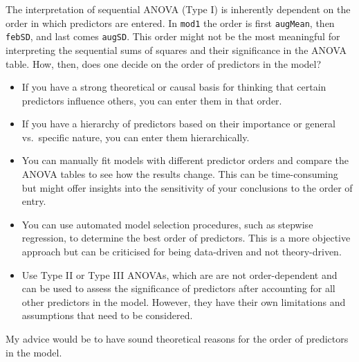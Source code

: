 \documentclass[
  letterpaper,
]{book}
\providecommand{\tightlist}{%
  \setlength{\itemsep}{0pt}\setlength{\parskip}{0pt}}\usepackage{longtable,booktabs,array}
\begin{document}
\begin{tcolorbox}[enhanced jigsaw, opacitybacktitle=0.6, toptitle=1mm, colframe=quarto-callout-note-color-frame, arc=.35mm, left=2mm, rightrule=.15mm, coltitle=black, opacityback=0, bottomrule=.15mm, bottomtitle=1mm, title=\textcolor{quarto-callout-note-color}{\faInfo}\hspace{0.5em}{Order in which predictors are assessed in multiple linear regression}, toprule=.15mm, colbacktitle=quarto-callout-note-color!10!white, titlerule=0mm, leftrule=.75mm, colback=white, breakable]

The interpretation of sequential ANOVA (Type I) is inherently dependent
on the order in which predictors are entered. In \texttt{mod1} the order
is first \texttt{augMean}, then \texttt{febSD}, and last comes
\texttt{augSD}. This order might not be the most meaningful for
interpreting the sequential sums of squares and their significance in
the ANOVA table. How, then, does one decide on the order of predictors
in the model?

\begin{itemize}
\tightlist
\item
  If you have a strong theoretical or causal basis for thinking that
  certain predictors influence others, you can enter them in that order.
\item
  If you have a hierarchy of predictors based on their importance or
  general vs.~specific nature, you can enter them hierarchically.
\item
  You can manually fit models with different predictor orders and
  compare the ANOVA tables to see how the results change. This can be
  time-consuming but might offer insights into the sensitivity of your
  conclusions to the order of entry.
\item
  You can use automated model selection procedures, such as stepwise
  regression, to determine the best order of predictors. This is a more
  objective approach but can be criticised for being data-driven and not
  theory-driven.
\item
  Use Type II or Type III ANOVAs, which are are not order-dependent and
  can be used to assess the significance of predictors after accounting
  for all other predictors in the model. However, they have their own
  limitations and assumptions that need to be considered.
\end{itemize}

My advice would be to have sound theoretical reasons for the order of
predictors in the model.

\end{tcolorbox}
\end{document}
